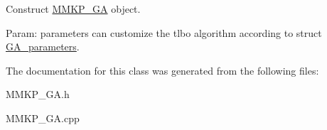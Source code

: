 Construct \hyperlink{class_m_m_k_p___g_a}{M\+M\+K\+P\+\_\+\+G\+A} object. 

Param\+: parameters can customize the tlbo algorithm according to struct \hyperlink{class_g_a__parameters}{G\+A\+\_\+parameters}. 

The documentation for this class was generated from the following files\+:\begin{DoxyCompactItemize}
\item 
M\+M\+K\+P\+\_\+\+G\+A.\+h\item 
M\+M\+K\+P\+\_\+\+G\+A.\+cpp\end{DoxyCompactItemize}
